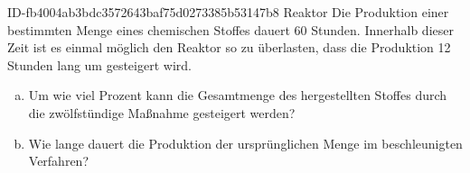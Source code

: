 \begin{exercise}
      {ID-fb4004ab3bdc3572643baf75d0273385b53147b8}
      {Reaktor}
  \ifproblem\problem
    Die Produktion einer bestimmten Menge eines chemischen Stoffes dauert 60 Stunden.
    Innerhalb dieser Zeit ist es einmal möglich den Reaktor so zu überlasten, dass
    die Produktion 12 Stunden lang um  gesteigert wird.
    \begin{enumerate}[a)]
      \item Um wie viel Prozent kann die Gesamtmenge des hergestellten Stoffes
            durch die zwölfstündige Maßnahme gesteigert werden?
      \item Wie lange dauert die Produktion der ursprünglichen Menge im
            beschleunigten Verfahren?
    \end{enumerate}
  \fi
\end{exercise}
